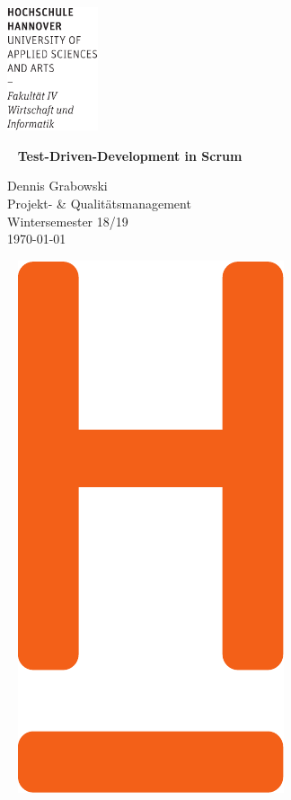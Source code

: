 \documentclass[12pt,DIV14,BCOR10mm,a4paper,twoside,parskip=half-,headsepline,headinclude,english,ngerman,bibliography=totocnumbered]{scrreprt}
\begin{document}
  \thispagestyle{empty} %
\includegraphics[width=0.2\textwidth]{Wortmarke_WI_schwarz}

   {  ~ \sffamily
  \vfill
  {\Huge\bfseries Test-Driven-Development in Scrum}
  \bigskip

  {\Large
  Dennis Grabowski \\[2ex]
  Projekt- \& Qualitätsmanagement \\
  Wintersemester 18/19
 \\[5ex]
   \today }
}
 \vfill

  ~ \hfill
  \includegraphics[height=0.3\paperheight]{H_WI_Pantone1665}

\vspace*{-3cm}

\tableofcontents  %
\end{document}
